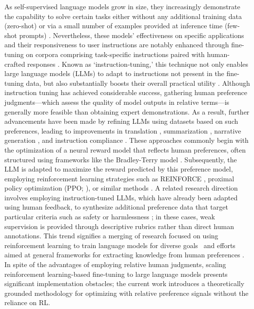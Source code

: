 As self-supervised language models grow in size, they increasingly demonstrate the capability to solve certain tasks either without any additional training data (zero-shot) \citep{radford2019language} or via a small number of examples provided at inference time (few-shot prompts) \citep{gpt3,megatron,chowdhery2022palm}. Nevertheless, these models’ effectiveness on specific applications and their responsiveness to user instructions are notably enhanced through fine-tuning on corpora comprising task-specific instructions paired with human-crafted responses \citep{mishra-etal-2022-cross,sanh2022multitask,chung2022scaling,thoppilan2022lamda}. Known as `instruction-tuning,' this technique not only enables large language models (LLMs) to adapt to instructions not present in the fine-tuning data, but also substantially boosts their overall practical utility \citep{chung2022scaling}. Although instruction tuning has achieved considerable success, gathering human preference judgments—which assess the quality of model outputs in relative terms—is generally more feasible than obtaining expert demonstrations. As a result, further advancements have been made by refining LLMs using datasets based on such preferences, leading to improvements in translation \citep{kreutzer-etal-2018-reliability}, summarization \citep{stiennon2022learning,ziegler2020finetuning}, narrative generation \citep{ziegler2020finetuning}, and instruction compliance \citep{ouyang2022training,ramamurthy2023is}. These approaches commonly begin with the optimization of a neural reward model that reflects human preferences, often structured using frameworks like the Bradley-Terry model \citep{bradley1952rankanalysis}. Subsequently, the LLM is adapted to maximize the reward predicted by this preference model, employing reinforcement learning strategies such as REINFORCE \citep{williams1992reinforce}, proximal policy optimization (PPO; \cite{schulman2017proximal}), or similar methods \citep{ramamurthy2023is}. A related research direction involves employing instruction-tuned LLMs, which have already been adapted using human feedback, to synthesize additional preference data that target particular criteria such as safety or harmlessness \citep{bai2022constitutional}; in these cases, weak supervision is provided through descriptive rubrics rather than direct human annotations. This trend signifies a merging of research focused on using reinforcement learning to train language models for diverse goals~\citep{Ranzato2015SequenceLT,paulus2018a,wu2018learning} and efforts aimed at general frameworks for extracting knowledge from human preferences \citep{christiano2017deep,kupcsik2018learning}. In spite of the advantages of employing relative human judgments, scaling reinforcement learning-based fine-tuning to large language models presents significant implementation obstacles; the current work introduces a theoretically grounded methodology for optimizing with relative preference signals without the reliance on RL.

